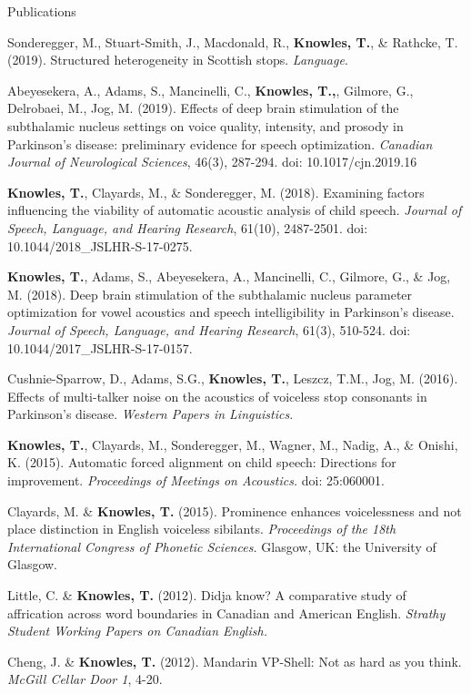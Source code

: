 \documentclass{resume} %
\begin{document}


\begin{rSection}{Publications}

Sonderegger, M., Stuart-Smith, J., Macdonald, R., {\bf Knowles, T.}, \& Rathcke, T. (2019). Structured heterogeneity in Scottish stops. \emph{Language}.

Abeyesekera, A., Adams, S., Mancinelli, C., {\bf Knowles, T.,}, Gilmore, G., Delrobaei, M., Jog, M. (2019).  Effects of deep brain stimulation of the subthalamic nucleus settings on voice quality, intensity, and prosody in Parkinson’s disease: preliminary evidence for speech optimization. \emph{Canadian Journal of Neurological Sciences}, 46(3), 287-294. doi: 10.1017/cjn.2019.16	

{\bf Knowles, T.}, Clayards, M., \& Sonderegger, M. (2018). Examining factors influencing the viability of automatic acoustic analysis of child speech. \emph{Journal of Speech, Language, and Hearing Research}, 61(10), 2487-2501. doi: 10.1044/2018\_JSLHR-S-17-0275.

{\bf Knowles, T.}, Adams, S., Abeyesekera, A., Mancinelli, C., Gilmore, G., \& Jog, M. (2018). Deep brain stimulation of the subthalamic nucleus parameter optimization for vowel acoustics and speech intelligibility in Parkinson's disease. \emph{Journal of Speech, Language, and Hearing Research}, 61(3), 510-524. doi: 10.1044/2017\_JSLHR-S-17-0157.

Cushnie-Sparrow, D., Adams, S.G., {\bf Knowles, T.}, Leszcz, T.M., Jog, M. (2016). Effects of multi-talker noise on the acoustics of voiceless stop consonants in Parkinson's disease. \emph{Western Papers in Linguistics.}

{\bf Knowles, T.}, Clayards, M., Sonderegger, M., Wagner, M., Nadig, A., \& Onishi, K. (2015). Automatic forced alignment on child speech: Directions for improvement. \emph{Proceedings of Meetings on Acoustics.} doi: 25:060001.

Clayards, M. \& {\bf Knowles, T.} (2015). Prominence enhances voicelessness and not place distinction in English voiceless sibilants. \emph{Proceedings of the 18th International Congress of Phonetic Sciences.} Glasgow, UK: the University of Glasgow.

Little, C. \& {\bf Knowles, T.} (2012). Didja know? A comparative study of affrication across word boundaries in Canadian and American English. \emph{Strathy Student Working Papers on Canadian English.}

Cheng, J. \& {\bf Knowles, T.} (2012). Mandarin VP-Shell: Not as hard as you think. \emph{McGill Cellar Door 1}, 4-20.

\end{rSection}
\end{document}
